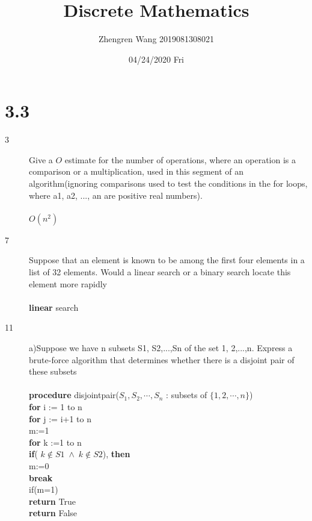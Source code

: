 \documentclass[UTF8]{article}
\title{Discrete Mathematics}
\author{Zhengren Wang 2019081308021}
\date{04/24/2020 Fri }
\begin{document}
\maketitle 

\part{3.3}
\begin{description}
    \item[3]Give a $O$ estimate for the number of operations,
where an operation is a comparison or a multiplication,
used in this segment of an algorithm(ignoring comparisons used to test the conditions in the for loops, where
a1, a2, ..., an are positive real numbers). \\\\
$O{(n^2)}$ \\
    \item[7]Suppose that an element is known to be among the first four elements in a list of 32 elements. Would a linear search or a binary search locate this element more rapidly \\\\
        \textbf{linear} search
    \item[11]
        a)Suppose we have n subsets S1, S2,...,Sn of the set {1, 2,...,n}. Express a brute-force algorithm that determines whether there is a disjoint pair of these subsets  \\\\
\hspace*{1cm}    \textbf{procedure} disjointpair($S_1, S_2,\cdots,S_n$ : subsets of $\{1,2,\cdots,n\}$)  \\
\hspace*{1cm}    \textbf{for} i := 1 to n   \\
\hspace*{2cm}       \textbf{for} j := i+1 to n  \\
\hspace*{3cm}            m:=1 \\
\hspace*{3cm}            \textbf{for} k :=1 to n  \\
\hspace*{4cm}                \textbf{if}( $k \notin S1 \;\land \; k \notin S2$), \textbf{then}  \\
\hspace*{5cm}                    m:=0   \\
\hspace*{5cm}                    \textbf{break}   \\
\hspace*{3cm}            if(m=1)   \\
\hspace*{4cm}                \textbf{return} True   \\
\hspace*{1cm}    \textbf{return} False   \\\\


\end{description}
\end{document}
